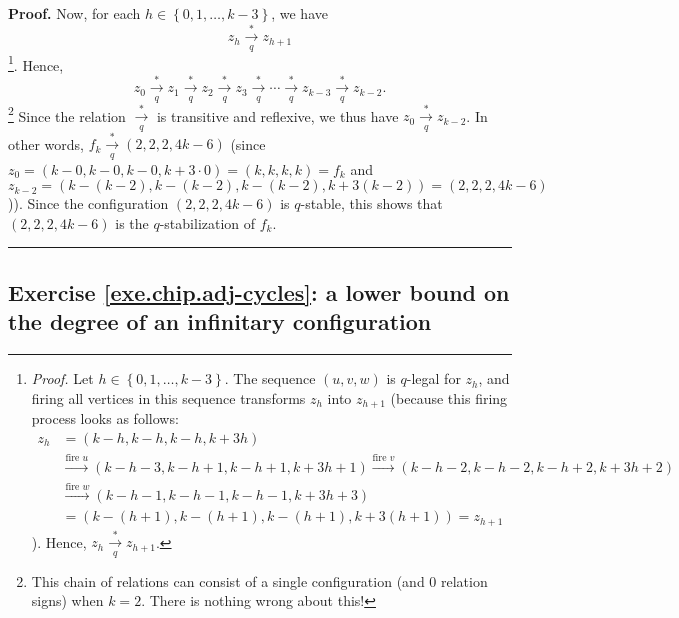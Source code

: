 \documentclass[numbers=enddot,12pt,final,onecolumn,notitlepage]{scrartcl}%
\theoremstyle{definition}
\newenvironment{proof}[1][Proof]{\noindent\textbf{#1.} }{\ \rule{0.5em}{0.5em}}
\begin{document}
\begin{proof}
Now, for each $h\in\left\{  0,1,\ldots,k-3\right\}  $, we have%
\[
z_{h}\underset{q}{\overset{\ast}{\rightarrow}}z_{h+1}%
\]
\footnote{\textit{Proof.} Let $h\in\left\{  0,1,\ldots,k-3\right\}  $. The
sequence $\left(  u,v,w\right)  $ is $q$-legal for $z_{h}$, and firing all
vertices in this sequence transforms $z_{h}$ into $z_{h+1}$ (because this
firing process looks as follows:%
\begin{align*}
z_{h}  &  =\left(  k-h,k-h,k-h,k+3h\right) \\
&  \overset{\text{fire }u}{\longrightarrow}\left(
k-h-3,k-h+1,k-h+1,k+3h+1\right)  \overset{\text{fire }v}{\longrightarrow
}\left(  k-h-2,k-h-2,k-h+2,k+3h+2\right) \\
&  \overset{\text{fire }w}{\longrightarrow}\left(
k-h-1,k-h-1,k-h-1,k+3h+3\right) \\
&  =\left(  k-\left(  h+1\right)  ,k-\left(  h+1\right)  ,k-\left(
h+1\right)  ,k+3\left(  h+1\right)  \right)  =z_{h+1}%
\end{align*}
). Hence, $z_{h}\underset{q}{\overset{\ast}{\rightarrow}}z_{h+1}$.}. Hence,%
\[
z_{0}\underset{q}{\overset{\ast}{\rightarrow}}z_{1}\underset{q}{\overset{\ast
}{\rightarrow}}z_{2}\underset{q}{\overset{\ast}{\rightarrow}}z_{3}%
\underset{q}{\overset{\ast}{\rightarrow}}\cdots\underset{q}{\overset{\ast
}{\rightarrow}}z_{k-3}\underset{q}{\overset{\ast}{\rightarrow}}z_{k-2}.
\]
\footnote{This chain of relations can consist of a single configuration (and
$0$ relation signs) when $k=2$. There is nothing wrong about this!} Since the
relation $\underset{q}{\overset{\ast}{\rightarrow}}$ is transitive and
reflexive, we thus have $z_{0}\underset{q}{\overset{\ast}{\rightarrow}}%
z_{k-2}$. In other words, $f_{k}\underset{q}{\overset{\ast}{\rightarrow}%
}\left(  2,2,2,4k-6\right)  $ (since $z_{0}=\left(  k-0,k-0,k-0,k+3\cdot
0\right)  =\left(  k,k,k,k\right)  =f_{k}$ and $z_{k-2}=\left(  k-\left(
k-2\right)  ,k-\left(  k-2\right)  ,k-\left(  k-2\right)  ,k+3\left(
k-2\right)  \right)  =\left(  2,2,2,4k-6\right)  $)). Since the configuration
$\left(  2,2,2,4k-6\right)  $ is $q$-stable, this shows that $\left(
2,2,2,4k-6\right)  $ is the $q$-stabilization of $f_{k}$.
\end{proof}

\subsection{Exercise \ref{exe.chip.adj-cycles}: a lower bound
on the degree of an infinitary configuration}
\end{document}
